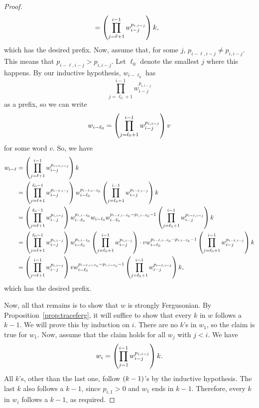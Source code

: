 \documentclass[english,12pt]{article}
\begin{document}
\begin{proof}
\begin{align*}
&=\left(\prod_{j=\ell+1}^{i-1}w_{i-j}^{p_{i, i-j}}\right)k,
\end{align*}
which has the desired prefix.  Now, assume that, for some $j$, $p_{i-\ell, i-j}\neq p_{i,i-j}$.  This means that $p_{i-\ell, i-j}>p_{i,i-j}$.  Let $\ell_0$ denote the smallest $j$ where this happens.  By our inductive hypothesis, $w_{i-\ell_0}$ has
\[
\prod_{j=\ell_0+1}^{i-1}w_{i-j}^{p_{i,i-j}}
\]
as a prefix, so we can write
\[
w_{i-\ell_0}=\left(\prod_{j=\ell_0+1}^{i-1}w_{i-j}^{p_{i,i-j}}\right)v
\]
for some word $v$.  So, we have
\begin{align*}
w_{i-\ell}&=\left(\prod_{j=\ell+1}^{i-1}w_{i-j}^{p_{i-\ell, i-j}}\right)k\\
&=\left(\prod_{j=\ell+1}^{\ell_0-1}w_{i-j}^{p_{i-\ell, i-j}}\right)w_{i-\ell_0}^{p_{i-\ell, i-\ell_0}}\left(\prod_{j=\ell_0+1}^{i-1}w_{i-j}^{p_{i-\ell, i-j}}\right)k\\
&=\left(\prod_{j=\ell+1}^{\ell_0-1}w_{i-j}^{p_{i, i-j}}\right)w_{i-\ell_0}^{p_{i, i-\ell_0}}w_{i-\ell_0}w_{i-\ell_0}^{p_{i-\ell, i-\ell_0}-p_{i,i-\ell_0}-1}\left(\prod_{j=\ell_0+1}^{i-1}w_{i-j}^{p_{i-\ell, i-j}}\right)k\\
&=\left(\prod_{j=\ell+1}^{\ell_0-1}w_{i-j}^{p_{i, i-j}}\right)w_{i-\ell_0}^{p_{i, i-\ell_0}}\left(\prod_{j=\ell_0+1}^{i-1}w_{i-j}^{p_{i,i-j}}\right)\cdot vw_{i-\ell_0}^{p_{i-\ell, i-\ell_0}-p_{i,i-\ell_0}-1}\left(\prod_{j=\ell_0+1}^{i-1}w_{i-j}^{p_{i-\ell, i-j}}\right)k\\
&=\left(\prod_{j=\ell+1}^{i-1}w_{i-j}^{p_{i, i-j}}\right)vw_{i-\ell_0}^{p_{i-\ell, i-\ell_0}-p_{i,i-\ell_0}-1}\left(\prod_{j=\ell_0+1}^{i-1}w_{i-j}^{p_{i-\ell, i-j}}\right)k,
\end{align*}
which has the desired prefix.

Now, all that remains is to show that $w$ is strongly Fergusonian.  By Proposition~\ref{prop:traceferg}, it will suffice to show that every $k$ in $w$ follows a $k-1$.  We will prove this by induction on $i$.  There are no $k$'s in $w_1$, so the claim is true for $w_1$.  Now, assume that the claim holds for all $w_j$ with $j<i$.  We have
\[
w_i=\left(\prod_{j=1}^{i-1}w_{i-j}^{p_{i,i-j}}\right)k.
\]
All $k$'s, other than the last one, follow $\left(k-1\right)$'s by the inductive hypothesis.  The last $k$ also follows a $k-1$, since $p_{i,1}>0$ and $w_1$ ends in $k-1$.  Therefore, every $k$ in $w_i$ follows a $k-1$, as required.
\end{proof}
\end{document}
